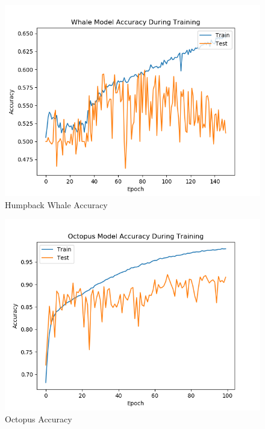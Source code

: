 \documentclass[11pt]{article}
\begin{document}
\begin{figure}
    \includegraphics[width=17cm]{HumpbackWhaleAccuracy.png}
  \caption{Humpback Whale Accuracy}
\end{figure}

\begin{figure}
    \includegraphics[width=17cm]{OctopusAccuracy.png}
  \caption{Octopus Accuracy}
\end{figure}
\end{document}
